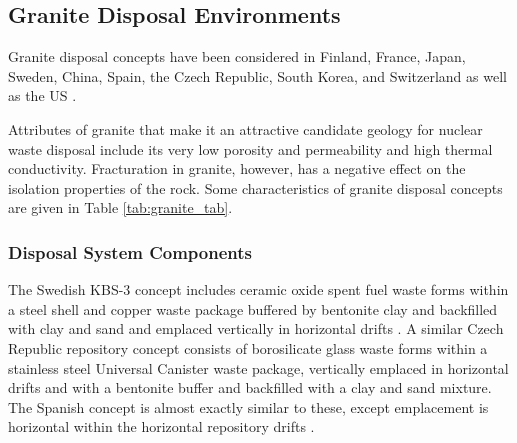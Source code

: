 

\subsection{Granite Disposal Environments}

Granite disposal concepts have been considered in Finland, France, Japan, 
Sweden, China,  Spain, the Czech Republic, South Korea, and Switzerland 
\cite{andra_granite:_2005, von_lensa_red-impact_2008} as well as the \gls{US} 
\cite{hardin_generic_2011}.

Attributes of granite that make it an attractive candidate geology for nuclear 
waste disposal include its very low porosity and permeability and high thermal 
conductivity. Fracturation in granite, however, has a negative effect on the 
isolation properties of the rock.
Some characteristics of granite disposal 
concepts are given in Table \ref{tab:granite_tab}.   



\subsubsection{Disposal System Components}

The Swedish KBS-3 concept includes ceramic oxide spent fuel waste forms within a 
steel shell and copper waste package buffered by bentonite clay and backfilled 
with clay and sand and emplaced vertically in horizontal drifts 
\cite{ab_long-term_2006}.
A similar Czech Republic repository concept consists of 
borosilicate glass waste forms within a stainless steel Universal Canister waste 
package, vertically emplaced in horizontal drifts and with a bentonite buffer  
and backfilled with a clay and sand mixture.
The Spanish concept is almost exactly similar to 
these, except emplacement is horizontal within the horizontal repository drifts
\cite{ von_lensa_red-impact_2008}.


